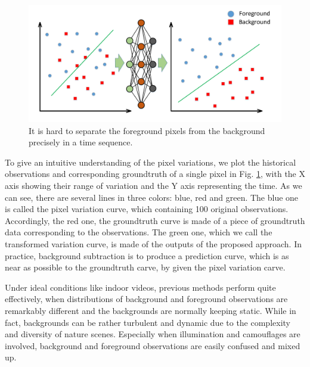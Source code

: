 \documentclass[journal]{IEEEtran}
\newcommand{\reffig}[1]{Fig. \ref{#1}}
\begin{document}
\begin{figure}[!t]	%
\centering
    \includegraphics[width=\linewidth]{figure/fig1}
    \caption{It is hard to separate the foreground pixels from the background precisely in a time sequence.}
    \label{variation_chart}
\end{figure}


To give an intuitive understanding of the pixel variations, we plot the historical observations and corresponding groundtruth of a single pixel in  \reffig{variation_chart}, with the X axis showing their range of variation and the Y axis representing the time. 
As we can see, there are several lines in three colors: blue, red and green. 
The blue one is called the pixel variation curve, which containing 100 original observations. 
Accordingly, the red one, the groundtruth curve is made of a piece of groundtruth data corresponding to the observations. 
The green one, which we call the transformed variation curve, is made of the outputs of the proposed approach. 
In practice, background subtraction is to produce a prediction curve, which is as near as possible to the groundtruth carve, by given the pixel variation carve. 

Under ideal conditions like indoor videos, previous methods perform quite effectively, when distributions of background and foreground observations are remarkably different and the backgrounds are normally keeping static. 
While in fact, backgrounds can be rather turbulent and dynamic due to the complexity and diversity of nature scenes. 
Especially when illumination and camouflages are involved, background and foreground observations are easily confused and mixed up. 
\end{document}

